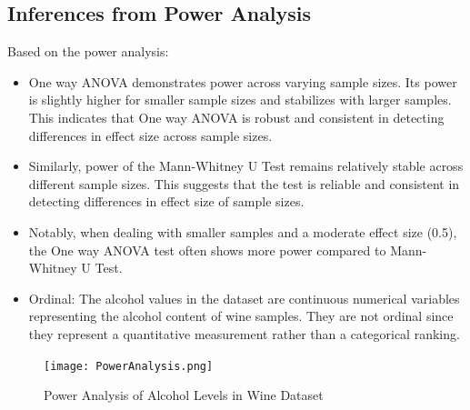 \documentclass{article}
\begin{document}
\newpage
\subsection {Inferences from Power Analysis}
Based on the power analysis: 
\begin{itemize}
\item One way ANOVA demonstrates power across varying sample sizes. Its power is slightly higher for smaller sample sizes and stabilizes with larger samples. This indicates that One way ANOVA is robust and consistent in detecting differences in effect size across sample sizes.
\item Similarly, power of the Mann-Whitney U Test remains relatively stable across different sample sizes. This suggests that the test is reliable and consistent in detecting differences in effect size of sample sizes.
\item Notably, when dealing with smaller samples and a moderate effect size (0.5), the One way ANOVA test often shows more power compared to Mann-Whitney U Test.
\item Ordinal: The alcohol values in the dataset are continuous numerical variables representing the alcohol content of wine samples. They are not ordinal since they represent a quantitative measurement rather than a categorical ranking.
\end{itemize}
\vspace{0.5in}
\begin{figure}[ht]
    \centering
    \texttt{[image: PowerAnalysis.png]}
    \caption{Power Analysis of Alcohol Levels in Wine Dataset}
    \label{fig:PowerAnalysis}
\end{figure}

\newpage
\end{document}
